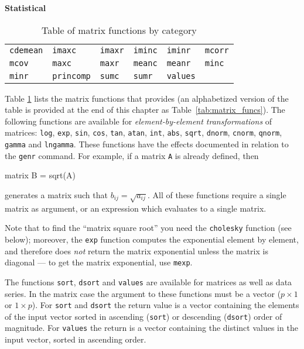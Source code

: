 \begin{table}[htbp]
\textbf{Statistical}
\hrulefill

\begin{tabular}{p{\cwid}p{\cwid}p{\cwid}p{\cwid}p{\cwid}p{\cwid}}
\texttt{cdemean}   &
\texttt{imaxc}     &
\texttt{imaxr}     &
\texttt{iminc}     &
\texttt{iminr}     &
\texttt{mcorr}     \\
\texttt{mcov}      &
\texttt{maxc}      &   
\texttt{maxr}      &
\texttt{meanc}     &
\texttt{meanr}     &
\texttt{minc}      \\   
\texttt{minr}      &
\texttt{princomp}  &
\texttt{sumc}      &
\texttt{sumr}      &
\texttt{values}    &
\end{tabular}      
\caption{Table of matrix functions by category}
\label{tab:matrix_funcs_cat}
\end{table}

Table \ref{tab:matrix_funcs_cat} lists the matrix functions that
 provides (an alphabetized version of the table is
provided at the end of this chapter as Table~\ref{tab:matrix_funcs}).
The following functions are available for \textit{element-by-element
  transformations} of matrices: \texttt{log}, \texttt{exp},
\texttt{sin}, \texttt{cos}, \texttt{tan}, \texttt{atan}, \texttt{int},
\texttt{abs}, \texttt{sqrt}, \texttt{dnorm}, \texttt{cnorm},
\texttt{qnorm}, \texttt{gamma} and \texttt{lngamma}.  These functions
have the effects documented in relation to the \texttt{genr} command.
For example, if a matrix \texttt{A} is already defined, then
%
\begin{code}
matrix B = sqrt(A)
\end{code}
%
generates a matrix such that $b_{ij} = \sqrt{a_{ij}}$.  All of these
functions require a single matrix as argument, or an expression which
evaluates to a single matrix.

Note that to find the ``matrix square root'' you need the
\texttt{cholesky} function (see below); moreover, the \texttt{exp}
function computes the exponential element by element, and therefore
does \emph{not} return the matrix exponential unless the matrix is
diagonal --- to get the matrix exponential, use \texttt{mexp}.
  
The functions \texttt{sort}, \texttt{dsort} and \texttt{values}
are available for matrices as well as data series.  In the matrix case
the argument to these functions must be a vector ($p \times 1$ or
$1\times p$).  For \texttt{sort} and \texttt{dsort} the return value
is a vector containing the elements of the input vector sorted in
ascending (\texttt{sort}) or descending (\texttt{dsort}) order of
magnitude.  For \texttt{values} the return is a vector containing the
distinct values in the input vector, sorted in ascending order.

